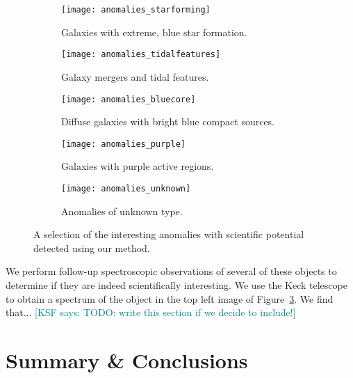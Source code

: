 \documentclass[fleqn,usenatbib,useAMS]{mnras}
\newcommand{\KSF}[1]{\textcolor{teal}{{[KSF says: #1]}}}
\begin{document}
\begin{figure*}
\vspace{0cm}
\begin{subfigure}{.4\textwidth}
  \centering
  \texttt{[image: anomalies\_starforming]}  
  \caption{Galaxies with extreme, blue star formation.}
  \label{fig:anom_sf}
\end{subfigure}
\hspace{2em}
\begin{subfigure}{.4\textwidth}
  \centering
  \texttt{[image: anomalies\_tidalfeatures]}  
  \caption{Galaxy mergers and tidal features.}
  \label{fig:anom_tidal}
\end{subfigure}
\vspace{1em}

\begin{subfigure}{.4\textwidth}
  \centering
  \texttt{[image: anomalies\_bluecore]}
  \caption{Diffuse galaxies with bright blue compact sources.}
  \label{fig:anom_bluecore}
\end{subfigure}
\hspace{2em}
\begin{subfigure}{.4\textwidth}
  \centering
  \texttt{[image: anomalies\_purple]}  
  \caption{Galaxies with purple active regions.}
  \label{fig:anom_purple}
\end{subfigure}

\vspace{1em}

\begin{subfigure}{.4\textwidth}
  \centering
  \texttt{[image: anomalies\_unknown]}
  \caption{Anomalies of unknown type.}
  \label{fig:anom_unknown}
\end{subfigure}
\vspace{0cm}
\caption{A selection of the interesting anomalies with scientific potential detected using our method.}
\label{fig:anomalies}
\end{figure*}

We perform follow-up spectroscopic observations of several of these objects to determine if they are indeed scientifically interesting.
We use the Keck telescope to obtain a spectrum of the object in the top left image of Figure~\ref{fig:anom_bluecore}.
We find that...
\KSF{TODO: write this section if we decide to include!}

\section{Summary \& Conclusions}
\label{sec:conclusions}
\end{document}
